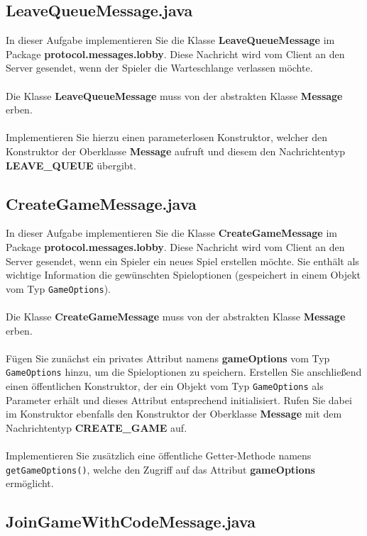 \documentclass[12pt]{article}
\begin{document}
\subsection*{LeaveQueueMessage.java}

In dieser Aufgabe implementieren Sie die Klasse \textbf{LeaveQueueMessage} im Package \textbf{protocol.messages.lobby}. Diese Nachricht wird vom Client an den Server gesendet, wenn der Spieler die Warteschlange verlassen möchte.
\\ \\
Die Klasse \textbf{LeaveQueueMessage} muss von der abstrakten Klasse \textbf{Message} erben.
\\ \\
Implementieren Sie hierzu einen parameterlosen Konstruktor, welcher den Konstruktor der Oberklasse \textbf{Message} aufruft und diesem den Nachrichtentyp \textbf{LEAVE\_QUEUE} übergibt.

\subsection*{CreateGameMessage.java}

In dieser Aufgabe implementieren Sie die Klasse \textbf{CreateGameMessage} im Package \textbf{protocol.messages.lobby}. Diese Nachricht wird vom Client an den Server gesendet, wenn ein Spieler ein neues Spiel erstellen möchte. Sie enthält als wichtige Information die gewünschten Spieloptionen (gespeichert in einem Objekt vom Typ \texttt{GameOptions}).
\\ \\
Die Klasse \textbf{CreateGameMessage} muss von der abstrakten Klasse \textbf{Message} erben.
\\ \\
Fügen Sie zunächst ein privates Attribut namens \textbf{gameOptions} vom Typ \texttt{GameOptions} hinzu, um die Spieloptionen zu speichern. Erstellen Sie anschließend einen öffentlichen Konstruktor, der ein Objekt vom Typ \texttt{GameOptions} als Parameter erhält und dieses Attribut entsprechend initialisiert. Rufen Sie dabei im Konstruktor ebenfalls den Konstruktor der Oberklasse \textbf{Message} mit dem Nachrichtentyp \textbf{CREATE\_GAME} auf.
\\ \\
Implementieren Sie zusätzlich eine öffentliche Getter-Methode namens \texttt{getGameOptions()}, welche den Zugriff auf das Attribut \textbf{gameOptions} ermöglicht.

\subsection*{JoinGameWithCodeMessage.java}
\end{document}
